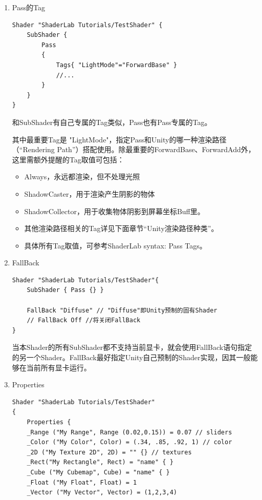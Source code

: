 \documentclass[9pt, b5paper]{article}
\begin{document}
\begin{enumerate}
\item Pass的Tag
\label{sec:org05a496e}
\begin{verbatim}
Shader "ShaderLab Tutorials/TestShader" {
    SubShader {
        Pass
        {
            Tags{ "LightMode"="ForwardBase" }
            //...
        }
    }
}
\end{verbatim}

和SubShader有自己专属的Tag类似，Pass也有Pass专属的Tag。

其中最重要Tag是 "LightMode"，指定Pass和Unity的哪一种渲染路径（“Rendering Path”）搭配使用。除最重要的ForwardBase、ForwardAdd外，这里需额外提醒的Tag取值可包括：

\begin{itemize}
\item Always，永远都渲染，但不处理光照
\item ShadowCaster，用于渲染产生阴影的物体
\item ShadowCollector，用于收集物体阴影到屏幕坐标Buff里。
\item 其他渲染路径相关的Tag详见下面章节“Unity渲染路径种类”。
\item 具体所有Tag取值，可参考ShaderLab syntax: Pass Tags。
\end{itemize}

\item FallBack
\label{sec:org9b4f056}
\begin{verbatim}
Shader "ShaderLab Tutorials/TestShader"{
    SubShader { Pass {} }

    FallBack "Diffuse" // "Diffuse"即Unity预制的固有Shader
    // FallBack Off //将关闭FallBack
}
\end{verbatim}

当本Shader的所有SubShader都不支持当前显卡，就会使用FallBack语句指定的另一个Shader。FallBack最好指定Unity自己预制的Shader实现，因其一般能够在当前所有显卡运行。

\item Properties
\label{sec:org34c3b8d}

\begin{verbatim}
Shader "ShaderLab Tutorials/TestShader"
{
    Properties {
    _Range ("My Range", Range (0.02,0.15)) = 0.07 // sliders
    _Color ("My Color", Color) = (.34, .85, .92, 1) // color
    _2D ("My Texture 2D", 2D) = "" {} // textures
    _Rect("My Rectangle", Rect) = "name" { }
    _Cube ("My Cubemap", Cube) = "name" { }
    _Float ("My Float", Float) = 1
    _Vector ("My Vector", Vector) = (1,2,3,4)


\end{verbatim}
\end{enumerate}
\end{document}
